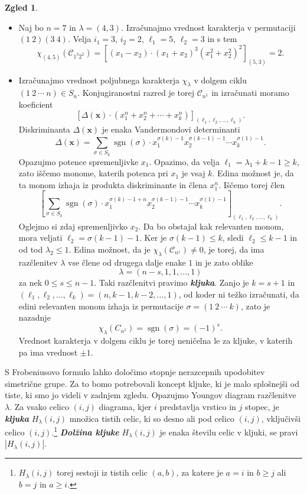 \documentclass[11pt]{book}
\def\conclass{\mathcal{C}}
\DeclareMathOperator\sgn{sgn}
\def\definicija{\color{rdeca}\bf\em}
\theoremstyle{definition}
\theoremstyle{zgled}
\newtheorem*{zgled}{Zgled}
\theoremstyle{odprtproblem}
\theoremstyle{domacanaloga}
\theoremstyle{izrek}
\begin{document}
\begin{zgled} \leavevmode
\begin{itemize}
\item Naj bo $n = 7$ in $\lambda = (4,3)$. Izračunajmo vrednost karakterja v permutaciji $(1 \ 2)(3 \ 4)$. Velja $i_1 = 3$, $i_2 = 2$, $\ell_1 = 5$, $\ell_2 = 3$ in s tem
\[
    \chi_{(4,5)}(\conclass_{1^3 2^2}) = 
    \left[ (x_1 - x_2) \cdot (x_1 + x_2)^3 (x_1^2 + x_2^2)^2 \right]_{(5,3)} =
    2.
\]

\item Izračunajmo vrednost poljubnega karakterja $\chi_{\lambda}$ v dolgem ciklu $(1 \ 2 \ \cdots \ n) \in S_n$. Konjugiranostni razred je torej $\conclass_{n^1}$ in izračunati moramo koeficient
\[
    \left[ \Delta(\mathbf{x}) \cdot (x_1^n + x_2^n + \cdots + x_k^n) \right]_{(\ell_1, \ell_2, \dots, \ell_k)}.
\]
Diskriminanta $\Delta(\mathbf{x})$ je enaka Vandermondovi determinanti
\[
    \Delta(\mathbf{x}) = \sum_{\sigma \in S_k} \sgn(\sigma) \cdot x_1^{\sigma(k) - 1} x_2^{\sigma(k-1) - 1} \cdots x_k^{\sigma(1) - 1}.
\]
Opazujmo potence spremenljivke $x_1$. Opazimo, da velja $\ell_1 = \lambda_1 + k - 1 \geq k$, zato iščemo monome, katerih potenca pri $x_1$ je vsaj $k$. Edina možnost je, da ta monom izhaja iz produkta diskriminante in člena $x_1^n$. Iščemo torej člen
\[
    \left[ \sum_{\sigma \in S_k} \sgn(\sigma) \cdot x_1^{\sigma(k) - 1 + n} x_2^{\sigma(k-1) - 1} \cdots x_k^{\sigma(1) - 1} \right]_{(\ell_1, \ell_2, \dots, \ell_k)}.
\]
Oglejmo si zdaj spremenljivko $x_2$. Da bo obstajal kak relevanten monom, mora veljati $\ell_2 = \sigma(k-1) - 1$. Ker je $\sigma(k-1) \leq k$, sledi $\ell_2 \leq k -1$ in od tod $\lambda_2 \leq 1$. Edina možnost, da je $\chi_{\lambda}(\conclass_{n^1}) \neq 0$, je torej, da ima razčlenitev $\lambda$ vse člene od drugega dalje enake $1$ in je zato oblike
\[
    \lambda = (n-s, 1, 1, \dots, 1)
\]
za nek $0 \leq s \leq n-1$. Taki razčlenitvi pravimo {\definicija kljuka}. Zanjo je $k = s+1$ in $(\ell_1, \ell_2, \dots, \ell_k) = (n, k-1, k-2, \dots, 1)$, od koder ni težko izračunati, da edini relevanten monom izhaja iz permutacije $\sigma = (1 \ 2 \ \cdots \ k)$, zato je nazadnje
\[
    \chi_{\lambda}(C_{n^1}) = \sgn(\sigma) = (-1)^s.
\]
Vrednost karakterja v dolgem ciklu je torej neničelna le za kljuke, v katerih pa ima vrednost $\pm 1$.
\end{itemize}
\end{zgled}

S Frobeniusovo formulo lahko določimo stopnje nerazcepnih upodobitev simetrične grupe. Za to bomo potrebovali koncept kljuke, ki je malo splošnejši od tiste, ki smo jo videli v zadnjem zgledu. Opazujmo Youngov diagram razčlenitve $\lambda$. Za vsako celico $(i,j)$ diagrama, kjer $i$ predstavlja vrstico in $j$ stopec, je {\definicija kljuka} $H_{\lambda}(i,j)$ množica tistih celic, ki so desno ali pod celico $(i,j)$, vključivši celico $(i,j)$.\footnote{$H_{\lambda}(i,j)$ torej sestoji iz tistih celic $(a,b)$, za katere je $a = i$ in $b \geq j$ ali $b = j$ in $a \geq i$.} {\definicija Dolžina kljuke} $H_{\lambda}(i,j)$ je enaka številu celic v kljuki, se pravi $|H_{\lambda}(i,j)|$.
\end{document}
